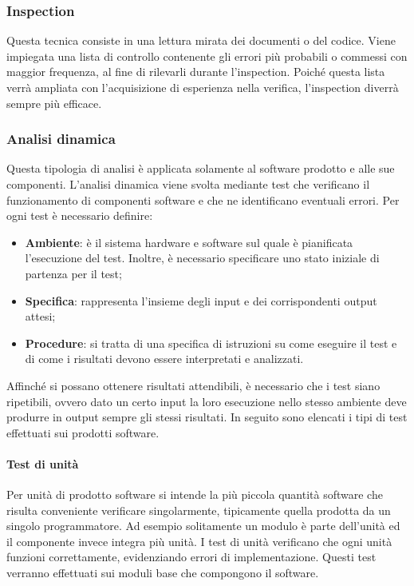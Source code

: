 \subsubsection{Inspection}
Questa tecnica consiste in una lettura mirata dei documenti o del codice. Viene impiegata una lista di controllo contenente gli errori più probabili o commessi con maggior frequenza, al fine di rilevarli durante l’inspection. Poiché questa lista verrà ampliata con l’acquisizione di esperienza nella verifica, l’inspection diverrà sempre più efficace.

\subsubsection{Analisi dinamica}
Questa tipologia di analisi è applicata solamente al software prodotto e alle sue componenti. L’analisi dinamica viene svolta mediante test che verificano il funzionamento di componenti software e che ne identificano eventuali errori. Per ogni test è necessario definire:
\begin{itemize}
\item \textbf{Ambiente}: è il sistema hardware e software sul quale è pianificata l’esecuzione del test. Inoltre, è necessario specificare uno stato iniziale di partenza per il test;
\item \textbf{Specifica}: rappresenta l’insieme degli input e dei corrispondenti output attesi;
\item \textbf{Procedure}: si tratta di una specifica di istruzioni su come eseguire il test e di come i risultati devono essere interpretati e analizzati.
\end{itemize}
Affinché si possano ottenere risultati attendibili, è necessario che i test siano ripetibili, ovvero dato un certo input la loro esecuzione nello stesso ambiente deve produrre in output sempre gli stessi risultati. In seguito sono elencati i tipi di test effettuati sui prodotti software.

\paragraph{Test di unità}
Per unità di prodotto software si intende la più piccola quantità software che risulta conveniente verificare singolarmente, tipicamente quella prodotta da un singolo programmatore. Ad esempio solitamente un modulo è parte dell’unità ed il componente invece integra più unità. I test di unità verificano che ogni unità funzioni correttamente, evidenziando errori di implementazione. Questi test verranno effettuati sui moduli base che compongono il software.

